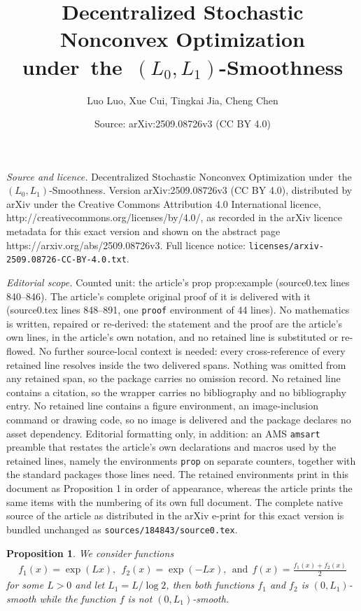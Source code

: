 \documentclass[10pt,a4paper]{amsart}
\title{Decentralized Stochastic Nonconvex Optimization under~the~$(L_0,L_1)$-Smoothness}
\author{Luo Luo, Xue Cui, Tingkai Jia, Cheng Chen}
\date{Source: arXiv:2509.08726v3 (CC BY 4.0)}
\newtheorem{prop}{Proposition}
\begin{document}
\maketitle

\noindent\emph{Source and licence.} Decentralized Stochastic Nonconvex Optimization under~the~$(L_0,L_1)$-Smoothness. Version arXiv:2509.08726v3 (CC BY 4.0), distributed by arXiv under the Creative Commons Attribution 4.0 International licence, http://creativecommons.org/licenses/by/4.0/, as recorded in the arXiv licence metadata for this exact version and shown on the abstract page https://arxiv.org/abs/2509.08726v3. Full licence notice: \texttt{licenses/arxiv-2509.08726-CC-BY-4.0.txt}.\par\smallskip

\noindent\textit{Editorial scope.} Counted unit: the article's prop prop:example (source0.tex lines 840--846). The article's complete original proof of it is delivered with it (source0.tex lines 848--891, one \texttt{proof} environment of 44 lines). No mathematics is written, repaired or re-derived: the statement and the proof are the article's own lines, in the article's own notation, and no retained line is substituted or re-flowed.  No further source-local context is needed: every cross-reference of every retained line resolves inside the two delivered spans.  Nothing was omitted from any retained span, so the package carries no omission record.  No retained line contains a citation, so the wrapper carries no bibliography and no bibliography entry.  No retained line contains a figure environment, an image-inclusion command or drawing code, so no image is delivered and the package declares no asset dependency.  Editorial formatting only, in addition: an AMS \texttt{amsart} preamble that restates the article's own declarations and macros used by the retained lines, namely the environments \texttt{prop} on separate counters, together with the standard packages those lines need.  The retained environments print in this document as Proposition 1 in order of appearance, whereas the article prints the same items with the numbering of its own full document.  The complete native source of the article as distributed in the arXiv e-print for this exact version is bundled unchanged as \texttt{sources/184843/source0.tex}.
\begin{prop}\label{prop:example}
We consider functions
\begin{align*}
    f_1(x) = \exp(Lx),~~f_2(x) = \exp(-Lx),~~\text{and}~~f(x) = \frac{f_1(x)+f_2(x)}{2}
\end{align*}
for some $L>0$ and let $L_1=L/\log 2$, then both functions $f_1$ and $f_2$ is $(0,L_1)$-smooth while the function $f$ is not $(0,L_1)$-smooth.
\end{prop}
\end{document}
